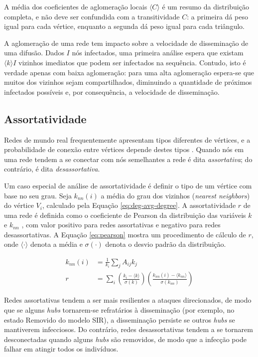 A média dos coeficientes de aglomeração locais $\langle C \rangle$ é um resumo da distribuição completa, 
e não deve ser confundida com a transitividade $C$: a primeira dá peso igual para cada vértice, 
enquanto a segunda dá peso igual para cada triângulo.

A aglomeração de uma rede tem impacto sobre a velocidade de disseminação de uma difusão. Dados $I$ nós
infectados, uma primeira análise espera que existam $\langle k \rangle I$ vizinhos imediatos que podem
ser infectados na sequência. Contudo, isto é verdade apenas com baixa aglomeração: para uma alta 
aglomeração espera-se que muitos dos vizinhos sejam compartilhados, diminuindo a quantidade de próximos
infectados possíveis e, por consequência, a velocidade de disseminação.

\subsection{Assortatividade}

Redes de mundo real frequentemente apresentam tipos diferentes de vértices, e a probabilidade de conexão 
entre vértices depende destes tipos \cite{newman2003structure}. Quando nós em uma rede tendem a se
conectar com nós semelhantes a rede é dita \emph{assortativa}; do contrário, é dita \emph{desassortativa}. 

Um caso especial de análise de assortatividade é definir o tipo de um vértice com base no seu 
grau. Seja $k_{nn}(i)$ a média do grau dos vizinhos (\textit{nearest neighbors}) do vértice $V_i$, 
calculado pela Equação \ref{eq:deg-avg-degree}. A assortatividade $r$ de uma rede é definida como o 
coeficiente de Pearson da distribuição das variáveis $k$ e $k_{nn}$ \cite{newman2002assortative}, 
com valor positivo para redes assortativas e negativo para redes desassortativas. 
A Equação \ref{eq:pearson} mostra um procedimento de cálculo de $r$, onde $\langle \cdot \rangle$ 
denota a média e $\sigma(\cdot)$ denota o desvio padrão da distribuição.

\begin{align}
 k_{nn}(i) &= \frac{1}{k_i} \sum_j A_{ij} k_j \label{eq:deg-avg-degree} \\
 r        &= \sum_i \left( \frac{k_i - \langle k \rangle}{\sigma(k)} \right) 
                    \left( \frac{k_{nn}(i) - \langle k_{nn} \rangle}{\sigma(k_{nn})} \right)
             \label{eq:pearson}
\end{align}

Redes assortativas tendem a ser mais resilientes a ataques direcionados, de modo que se alguns 
\textit{hubs} tornarem-se refratários à disseminação (por exemplo, no estado Removido do modelo
SIR), a disseminação persiste se outros \textit{hubs} se mantiverem infecciosos. Do contrário,
redes desassortativas tendem a se tornarem desconectadas quando alguns \textit{hubs} são 
removidos, de modo que a infecção pode falhar em atingir todos os indivíduos.

